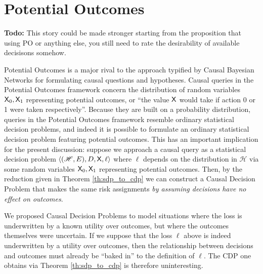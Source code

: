 
\section{Potential Outcomes}

\textbf{Todo: } This story could be made stronger starting from the proposition that using PO or anything else, you still need to rate the desirability of available decisisons somehow.

Potential Outcomes is a major rival to the approach typified by Causal Bayesian Networks for formulating causal questions and hypotheses. Causal queries in the Potential Outcomes framework concern the distribution of random variables $\mathsf{X}_0, \mathsf{X}_1$ representing potential outcomes, or ``the value $\mathsf{X}$ would take if action 0 or 1 were taken respectively''. Because they are built on a probability distribution, queries in the Potential Outcomes framework resemble ordinary statistical decision problems, and indeed it is possible to formulate an ordinary statistical decision problem featuring potential outcomes. This has an important implication for the present discussion: suppose we approach a causal query as a statistical decision problem $\langle (\mathscr{H}, E),D,\mathsf{X},\ell\rangle$ where $\ell$ depends on the distribution in $\mathscr{H}$ via some random variables $\mathsf{X}_0,\mathsf{X}_1$ representing potential outcomes. Then, by the reduction given in Theorem \ref{th:sdp_to_cdp} we can construct a Causal Decision Problem that makes the same risk assignments \emph{by assuming decisions have no effect on outcomes}. 

We proposed Causal Decision Problems to model situations where the loss is underwritten by a known utility over outcomes, but where the outcomes themselves were uncertain. If we suppose that the loss $\ell$ above is indeed underwritten by a utility over outcomes, then the relationship between decisions and outcomes must already be ``baked in'' to the definition of $\ell$. The CDP one obtains via Theorem \ref{th:sdp_to_cdp} is therefore uninteresting.

